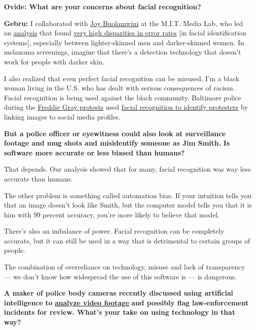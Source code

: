 \textbf{Ovide: What are your concerns about facial recognition?}

\textbf{Gebru:} I collaborated with
\href{https://www.ajlunited.org/about}{Joy Buolamwini} at the M.I.T.
Media Lab, who led an \href{http://gendershades.org/}{analysis} that
found
\href{https://www.nytimes3xbfgragh.onion/2018/06/21/opinion/facial-analysis-technology-bias.html}{very
high disparities in error rates} {[}in facial identification systems{]},
especially between lighter-skinned men and darker-skinned women. In
melanoma screenings, imagine that there's a detection technology that
doesn't work for people with darker skin.

I also realized that even perfect facial recognition can be misused. I'm
a black woman living in the U.S. who has dealt with serious consequences
of racism. Facial recognition is being used against the black community.
Baltimore police during the
\href{https://www.nytimes3xbfgragh.onion/2016/04/13/us/baltimore-freddie-gray.html}{Freddie
Gray protests} used
\href{https://www.baltimoresun.com/news/crime/bs-md-facial-recognition-20161017-story.html}{facial
recognition to identify protesters} by linking images to social media
profiles.

\textbf{But a police officer or eyewitness could also look at
surveillance footage and mug shots and misidentify someone as Jim Smith.
Is software more accurate or less biased than humans?}

That depends. Our analysis showed that for many, facial recognition was
way less accurate than humans.

The other problem is something called automation bias. If your intuition
tells you that an image doesn't look like Smith, but the computer model
tells you that it is him with 99 percent accuracy, you're more likely to
believe that model.

There's also an imbalance of power. Facial recognition can be completely
accurate, but it can still be used in a way that is detrimental to
certain groups of people.

The combination of overreliance on technology, misuse and lack of
transparency --- we don't know how widespread the use of this software
is --- is dangerous.

\textbf{A maker of police body cameras recently discussed using
artificial intelligence to}
\textbf{\href{https://www.bloomberg.com/news/newsletters/2020-06-05/should-police-officers-wear-body-cameras}{analyze
video footage}} \textbf{and possibly flag law-enforcement incidents for
review. What's your take on using technology in that way?}

